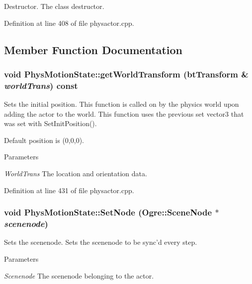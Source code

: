 Destructor. The class destructor. 

Definition at line 408 of file physactor.cpp.

\subsection{Member Function Documentation}
\hypertarget{classPhysMotionState_ad7f6fc932da90cc2a718fbe809d95287}{
\subsubsection[{getWorldTransform}]{\setlength{\rightskip}{0pt plus 5cm}void PhysMotionState::getWorldTransform (btTransform \& {\em worldTrans}) const}}
\label{d2/d14/classPhysMotionState_ad7f6fc932da90cc2a718fbe809d95287}


Sets the initial position. This function is called on by the physics world upon adding the actor to the world. This function uses the previous set vector3 that was set with SetInitPosition(). \par
 Default position is (0,0,0). 
\begin{DoxyParams}{Parameters}
\item[{\em WorldTrans}]The location and orientation data. \end{DoxyParams}


Definition at line 431 of file physactor.cpp.\hypertarget{classPhysMotionState_a4ba21f0b58f33197b61cf1a9754027bc}{
\subsubsection[{SetNode}]{\setlength{\rightskip}{0pt plus 5cm}void PhysMotionState::SetNode (Ogre::SceneNode $\ast$ {\em scenenode})}}
\label{d2/d14/classPhysMotionState_a4ba21f0b58f33197b61cf1a9754027bc}


Sets the scenenode. Sets the scenenode to be sync'd every step. 
\begin{DoxyParams}{Parameters}
\item[{\em Scenenode}]The scenenode belonging to the actor. \end{DoxyParams}


